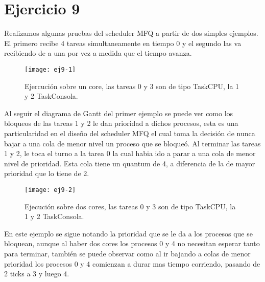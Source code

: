 \section{Ejercicio 9}

Realizamos algunas pruebas del scheduler MFQ a partir de dos simples ejemplos. El primero recibe 4 tareas simultaneamente en tiempo 0 y el segundo las va recibiendo de a una por vez a medida que el tiempo avanza.

\begin{figure}[H]
		\centering
		\texttt{[image: ej9-1]}
		\caption{Ejercución sobre un core, las tareas 0 y 3 son de tipo TaskCPU, la 1 y 2 TaskConsola.}
		\label{fig:ej9}
\end{figure}

Al seguir el diagrama de Gantt del primer ejemplo se puede ver como los bloqueos de las tareas 1 y 2 le dan prioridad a dichos procesos, esta es una particularidad en el diseño del scheduler MFQ el cual toma la decisión de nunca bajar a una cola de menor nivel un proceso que se bloqueó. Al terminar las tareas 1 y 2, le toca el turno a la tarea 0 la cual habia ido a parar a una cola de menor nivel de prioridad. Esta cola tiene un quantum de 4, a diferencia de la de mayor prioridad que lo tiene de 2.

\begin{figure}[H]
		\centering
		\texttt{[image: ej9-2]}
		\caption{Ejecución sobre dos cores, las tareas 0 y 3 son de tipo TaskCPU, la 1 y 2 TaskConsola. }
		\label{fig:ej9}
\end{figure}

En este ejemplo se sigue notando la prioridad que se le da a los procesos que se bloquean, aunque al haber dos cores los procesos 0 y 4 no necesitan esperar tanto para terminar, también se puede observar como al ir bajando a colas de menor prioridad los procesos 0 y 4 comienzan a durar mas tiempo corriendo, pasando de 2 ticks a 3 y luego 4.
